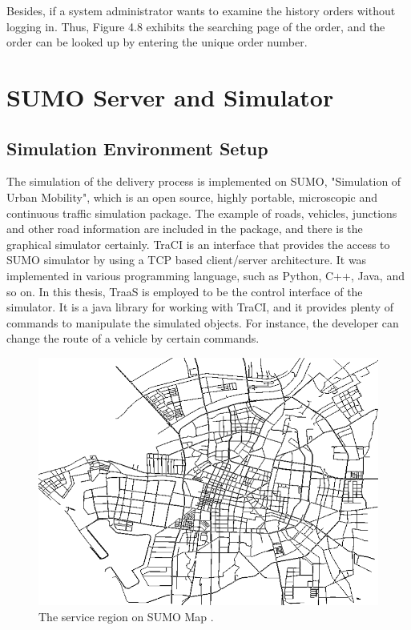 \documentclass[12pt]{ksthesis}
\begin{document}
\begin{thesis}
{Besides, if a system administrator wants to examine the history orders without logging in. Thus, Figure 4.8 exhibits the searching page of the order, and the order can be looked up by entering the unique order number. 




\section{SUMO Server and Simulator}

\subsection{Simulation Environment Setup}

The simulation of the delivery process is implemented on SUMO, "Simulation of Urban Mobility", which is an open source, highly portable, microscopic and continuous traffic simulation package. The example of roads, vehicles, junctions and other road information are included in the package, and there is the graphical simulator certainly. TraCI is an interface that provides the access to SUMO simulator by using a TCP based client/server architecture. It was implemented in various programming language, such as Python, C++, Java, and so on. In this thesis, TraaS is employed to be the control interface of the simulator. It is a java library for working with TraCI, and it provides plenty of commands to manipulate the simulated objects. For instance, the developer can change the route of a vehicle by certain commands.

\begin{figure}[H]
\centering
\includegraphics[width=1.0\textwidth]{./figures/F4-9-SUMOMap.PNG}
\caption{\large The service region on SUMO Map .}
\vspace{0.5cm}
\label{Fig:SUMOMap}
\end{figure}



}
\end{thesis}
\end{document}
